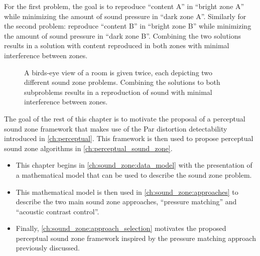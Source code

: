 For the first problem, the goal is to reproduce ``content A'' in ``bright zone A'' while minimizing 
the amount of sound pressure in ``dark zone A''.
Similarly for the second problem: reproduce ``content B'' in ``bright zone B'' while minimizing the 
amount of sound pressure in ``dark zone B''.
Combining the two solutions results in a solution with content reproduced in both zones with 
minimal interference between zones.

\begin{figure}[]
    \centering
    \begin{subfigure}{0.49\linewidth}
        \centering
        \scalebox{0.9}{}
    \end{subfigure}
    \begin{subfigure}{0.49\linewidth}
        \centering
        \scalebox{0.9}{}
    \end{subfigure}
    \caption{A birds-eye view of a room is given twice, each depicting two different sound zone problems. Combining the solutions to both subproblems results in a reproduction of sound with minimal interference between zones.}
    \label{fig:sound_zones:background:bright_dark_example}
\end{figure}

The goal of the rest of this chapter is to motivate the proposal of a perceptual sound zone framework that makes use
of the Par distortion detectability introduced in \autoref{ch:perceptual}.
This framework is then used to propose perceptual sound zone algorithms in \autoref{ch:perceptual_sound_zone}.
\begin{itemize}
    \item This chapter begins in \autoref{ch:sound_zone:data_model} with the presentation of  
        a mathematical model that can be used to describe the sound zone problem.
    \item This mathematical model is then used in \autoref{ch:sound_zone:approaches} 
        to describe the two main sound zone approaches, ``pressure matching'' and ``acoustic contrast control''.
    \item Finally, \autoref{ch:sound_zone:approach_selection} motivates the proposed perceptual sound zone framework
        inspired by the pressure matching approach previously discussed.
\end{itemize}
